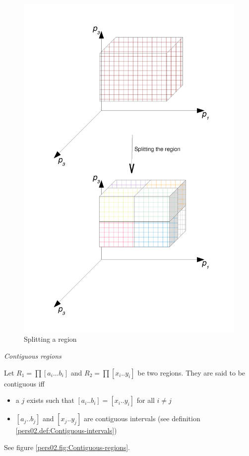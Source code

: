 \begin{defn}
\begin{figure}[h]
\includegraphics[width=0.9\columnwidth]{img/splitting_the_region}

\caption{\label{pers02.fig:Splitting-a-region}Splitting a region}


\end{figure}

\end{defn}

\begin{defn}
\emph{Contiguous regions}

Let $R_{1}=\prod\left[a_{i}\dots b_{i}\right]$ and $R_{2}=\prod\left[x_{i}..y_{i}\right]$
be two regions. They are said to be contiguous iff
\begin{itemize}
\item a $j$ exists such that $\left[a_{i}..b_{i}\right]=\left[x_{i}..y_{i}\right]$
for all $i\neq j$ 
\item $\left[a_{j}..b_{j}\right]$ and $\left[x_{j}..y_{j}\right]$ are
contiguous intervals (see definition \ref{pers02.def:Contiguous-intervals})
\end{itemize}
\end{defn}
See figure \ref{pers02.fig:Contiguous-regions}.


